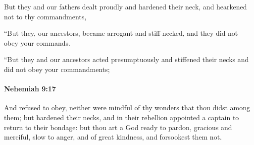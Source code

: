 			\begin{versebox}
					\item[BHS] 
					\item[LXX] 
					\item[ASV] But they and our fathers dealt proudly and hardened their neck, and hearkened not to thy commandments,
					\item[NIV] “But they, our ancestors, became arrogant and stiff-necked, and they did not obey your commands.
					\item[NRSV] “But they and our ancestors acted presumptuously and stiffened their necks and did not obey your commandments;
			\end{versebox}

		\paragraph{Nehemiah 9:17} %
			\label{NEHEMIAH-9-17}

			And refused to obey, neither were mindful of thy wonders that thou didst among them; but hardened their necks, and in their rebellion appointed a captain to return to their bondage: but thou art a God ready to pardon, gracious and merciful, slow to anger, and of great kindness, and forsookest them not.

